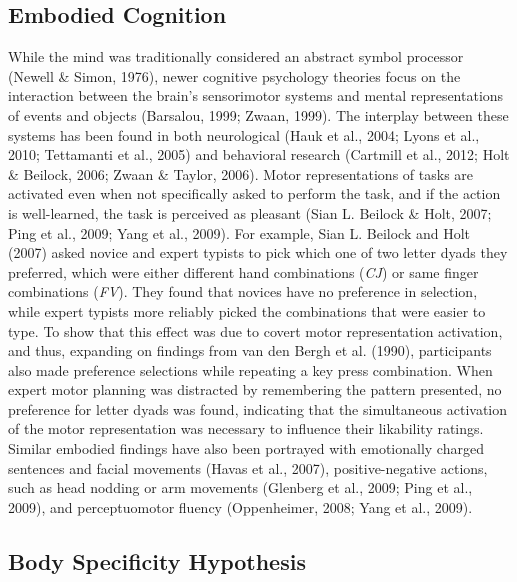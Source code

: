\documentclass[
  english,
  man]{apa7}
\begin{document}
\hypertarget{embodied-cognition}{%
\subsection{Embodied Cognition}\label{embodied-cognition}}

While the mind was traditionally considered an abstract symbol processor (Newell \& Simon, 1976), newer cognitive psychology theories focus on the interaction between the brain's sensorimotor systems and mental representations of events and objects (Barsalou, 1999; Zwaan, 1999). The interplay between these systems has been found in both neurological (Hauk et al., 2004; Lyons et al., 2010; Tettamanti et al., 2005) and behavioral research (Cartmill et al., 2012; Holt \& Beilock, 2006; Zwaan \& Taylor, 2006). Motor representations of tasks are activated even when not specifically asked to perform the task, and if the action is well-learned, the task is perceived as pleasant (Sian L. Beilock \& Holt, 2007; Ping et al., 2009; Yang et al., 2009). For example, Sian L. Beilock and Holt (2007) asked novice and expert typists to pick which one of two letter dyads they preferred, which were either different hand combinations (\emph{CJ}) or same finger combinations (\emph{FV}). They found that novices have no preference in selection, while expert typists more reliably picked the combinations that were easier to type. To show that this effect was due to covert motor representation activation, and thus, expanding on findings from van den Bergh et al. (1990), participants also made preference selections while repeating a key press combination. When expert motor planning was distracted by remembering the pattern presented, no preference for letter dyads was found, indicating that the simultaneous activation of the motor representation was necessary to influence their likability ratings. Similar embodied findings have also been portrayed with emotionally charged sentences and facial movements (Havas et al., 2007), positive-negative actions, such as head nodding or arm movements (Glenberg et al., 2009; Ping et al., 2009), and perceptuomotor fluency (Oppenheimer, 2008; Yang et al., 2009).

\hypertarget{body-specificity-hypothesis}{%
\subsection{Body Specificity Hypothesis}\label{body-specificity-hypothesis}}
\end{document}
